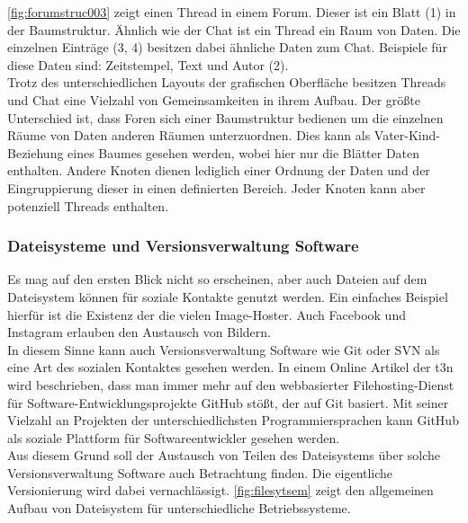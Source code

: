 \documentclass[a4paper]{article}
\begin{document}
	\autoref{fig:forumstruc003} zeigt einen Thread in einem Forum. Dieser ist
	ein Blatt (1) in der Baumstruktur. Ähnlich wie der Chat ist ein Thread ein
	Raum von Daten. Die einzelnen Einträge (3, 4) besitzen dabei  ähnliche Daten
	zum Chat. Beispiele für diese Daten sind: Zeitstempel, Text und Autor (2). \\
	
	Trotz des unterschiedlichen Layouts der grafischen Oberfläche besitzen
	Threads und Chat eine Vielzahl von Gemeinsamkeiten in ihrem Aufbau. Der
	größte Unterschied ist, dass Foren sich einer Baumstruktur bedienen um
	die einzelnen Räume von Daten anderen Räumen unterzuordnen. Dies kann
	als Vater-Kind-Beziehung eines Baumes gesehen werden, wobei hier nur die Blätter
	Daten enthalten. Andere Knoten dienen lediglich einer Ordnung der Daten und 
	der Eingruppierung dieser in einen definierten Bereich. Jeder Knoten kann
	aber potenziell Threads enthalten.
	
	\subsubsection{Dateisysteme und Versionsverwaltung Software}	
	
	Es mag auf den ersten Blick nicht so erscheinen, aber auch Dateien auf
	dem Dateisystem können für soziale Kontakte genutzt werden. Ein einfaches
	Beispiel hierfür ist die Existenz der die vielen Image-Hoster. Auch 
	Facebook und Instagram erlauben den Austausch von Bildern. \\
	
	In diesem Sinne kann auch Versionsverwaltung Software wie Git oder SVN als
	eine Art des sozialen Kontaktes gesehen werden. In einem Online Artikel der
	t3n \cite{articleGitHub} wird beschrieben, dass man immer mehr auf den
	webbasierter Filehosting-Dienst für Software-Entwicklungsprojekte GitHub
	\cite{gitHub} stößt, der auf Git basiert. Mit seiner Vielzahl an Projekten
	der unterschiedlichsten Programmiersprachen kann GitHub als soziale Plattform
	für Softwareentwickler gesehen werden. \\
	
	Aus diesem Grund soll der Austausch von Teilen des Dateisystems über solche 
	Versionsverwaltung Software auch Betrachtung finden. Die eigentliche
	Versionierung wird dabei vernachlässigt. \autoref{fig:filesytsem}
	zeigt den allgemeinen Aufbau von Dateisystem für unterschiedliche
	Betriebssysteme.
	
\end{document}
